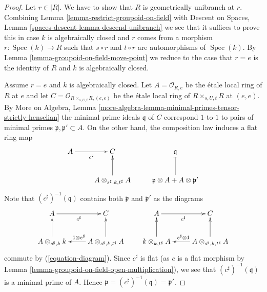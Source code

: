 \documentclass{stacks-project}
\theoremstyle{plain}
\theoremstyle{definition}
\theoremstyle{remark}
\numberwithin{equation}{subsection}
\def\Spec{\mathop{\mathrm{Spec}}}
\begin{document}
\begin{proof}
Let $r \in |R|$. We have to show that $R$ is geometrically unibranch
at $r$. Combining
Lemma \ref{lemma-restrict-groupoid-on-field}
with
Descent on Spaces, Lemma \ref{spaces-descent-lemma-descend-unibranch}
we see that it suffices to prove this in case $k$ is algebraically closed
and $r$ comes from a morphism $r : \Spec(k) \to R$ such that
$s \circ r$ and $t \circ r$
are automorphisms of $\Spec(k)$. By
Lemma \ref{lemma-groupoid-on-field-move-point}
we reduce to the case that $r = e$ is the identity of $R$ and $k$ is
algebraically closed.

\medskip\noindent
Assume $r = e$ and $k$ is algebraically closed. Let
$A = \mathcal{O}_{R, e}$ be the \'etale local ring of
$R$ at $e$ and let
$C = \mathcal{O}_{R \times_{s, U, t} R, (e, e)}$
be the \'etale local ring of $R \times_{s, U, t} R$ at $(e, e)$.
By More on Algebra, Lemma
\ref{more-algebra-lemma-minimal-primes-tensor-strictly-henselian}
the minimal prime ideals $\mathfrak q$ of $C$ correspond $1$-to-$1$
to pairs of minimal primes $\mathfrak p, \mathfrak p' \subset A$.
On the other hand, the composition law induces a flat ring map
$$
\xymatrix{
A \ar[r]_{c^\sharp} & C & \mathfrak q \\
& A \otimes_{s^\sharp, k, t^\sharp} A \ar[u] &
\mathfrak p \otimes A + A \otimes \mathfrak p' \ar@{|}[u]
}
$$
Note that $(c^\sharp)^{-1}(\mathfrak q)$ contains both $\mathfrak p$ and
$\mathfrak p'$ as the diagrams
$$
\xymatrix{
A \ar[r]_{c^\sharp} & C \\
A \otimes_{s^\sharp, k} k \ar[u] &
A \otimes_{s^\sharp, k, t^\sharp} A \ar[l]_{1 \otimes e^\sharp} \ar[u]
}
\quad\quad
\xymatrix{
A \ar[r]_{c^\sharp} & C \\
k \otimes_{k, t^\sharp} A \ar[u] &
A \otimes_{s^\sharp, k, t^\sharp} A \ar[l]_{e^\sharp \otimes 1} \ar[u]
}
$$
commute by (\ref{equation-diagram}).
Since $c^\sharp$ is flat (as $c$ is a flat morphism by
Lemma \ref{lemma-groupoid-on-field-open-multiplication}),
we see that $(c^\sharp)^{-1}(\mathfrak q)$ is a minimal prime
of $A$. Hence $\mathfrak p = (c^\sharp)^{-1}(\mathfrak q) = \mathfrak p'$.
\end{proof}
\end{document}
